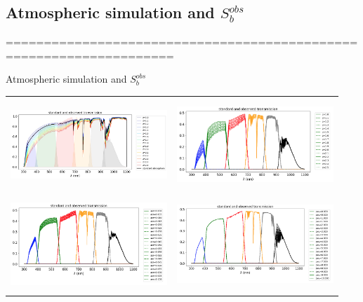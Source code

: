 \documentclass{beamer}
\begin{document}
\subsection{Atmospheric simulation and $S_b^{obs}$}
====================================================================
\begin{frame}{Atmospheric simulation and $S_b^{obs}$}
\begin{tabular}{cc}
\includegraphics[width=5.9cm, height=3.5cm]{figs/atmsimu/atmsimvsairmass.png} & \includegraphics[width=5.9cm, height=3.5cm]{figs/atmsimu/trb_vs_airmass.png} \\
\includegraphics[width=5.9cm, height=3.5cm]{figs/atmsimu/trb_vs_VAOD.png} & \includegraphics[width=5.9cm, height=3.5cm]{figs/atmsimu/trb_vs_PWV.png}
\end{tabular}
\end{frame}
\end{document}
